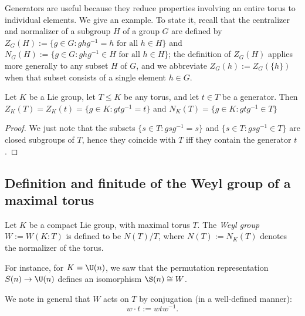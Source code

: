 \documentclass[reqno]{amsart} 
\begin{document}
Generators are useful because they reduce properties involving an entire torus to individual elements.  We give an example.  To state it, recall that the centralizer and normalizer of a subgroup $H$ of a group $G$ are defined by $Z_G(H) := \{g \in G : g h g^{-1} = h \text{ for all } h \in H\}$ and $N_G(H) := \{g \in G : g h g^{-1} \in H \text{ for all } h \in H\}$; the definition of $Z_G(H)$ applies more generally to any subset $H$ of $G$, and we abbreviate $Z_G(h) := Z_G(\{h\})$ when that subset consists of a single element $h \in G$.
\begin{lemma}\label{lem:generators-cent-norm}
  Let $K$ be a Lie group, let $T \leq K$ be any torus, and let $t \in T$ be a generator.  Then $Z_K(T) = Z_K(t) = \{g \in K : g t g^{-1} = t\}$ and $N_K(T) = \{g \in K : g t g^{-1} \in T\}$
\end{lemma}
\begin{proof}
  We just note that the subsets $\{s \in T : g s g^{-1} = s\}$ and $\{s \in T : g s g^{-1} \in T\}$ are closed subgroups of $T$, hence they coincide with $T$ iff they contain the generator $t$.
\end{proof}

\subsection{Definition and finitude of the Weyl group of a maximal torus}\label{sec:cnh2vouo3r}
\begin{definition}
  Let $K$ be a compact Lie group, with maximal torus $T$.  The \emph{Weyl group} $W := W(K:T)$ is defined to be $N(T)/T$, where $N(T) := N_K(T)$ denotes the normalizer of the torus.
\end{definition}
For instance, for $K = \U(n)$, we saw that the permutation representation $S(n) \rightarrow \U(n)$ defines an isomorphism $\S(n) \cong W$.

We note in general that $W$ acts on $T$ by conjugation (in a well-defined manner):
\begin{equation*}
  w \cdot t := w t w^{-1}.
\end{equation*}
\end{document}
